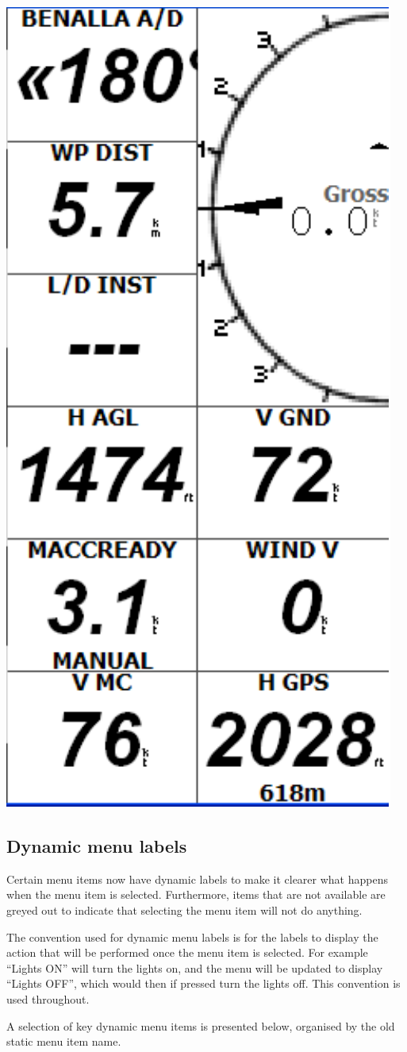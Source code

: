 \documentclass[a4paper,12pt]{refrep}
\begin{document}
\begin{center}

\includegraphics[angle=0,width=0.35\linewidth,keepaspectratio='true']{figures/infoboxes.pdf}

\end{center}

\subsection*{Dynamic menu labels}

Certain menu items now have dynamic labels to make it clearer what
happens when the menu item is selected.  Furthermore, items that are
not available are greyed out to indicate that selecting the menu item
will not do anything.

The convention used for dynamic menu labels is for the labels to
display the action that will be performed once the menu item is
selected.  For example ``Lights ON'' will turn the lights on, and the
menu will be updated to display ``Lights OFF'', which would then if
pressed turn the lights off.  This convention is used throughout.

A selection of key dynamic menu items is presented below, organised by the
old static menu item name.  
\end{document}
